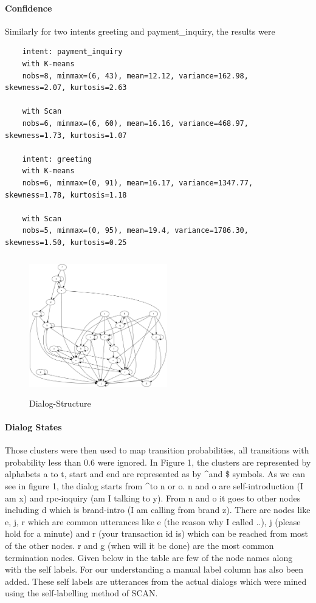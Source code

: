 \documentclass{article}
\begin{document}
\paragraph{Confidence}
Similarly for two intents greeting and payment\_inquiry, the results were

\begin{verbatim}
    intent: payment_inquiry
    with K-means
    nobs=8, minmax=(6, 43), mean=12.12, variance=162.98, skewness=2.07, kurtosis=2.63
    
    with Scan
    nobs=6, minmax=(6, 60), mean=16.16, variance=468.97, skewness=1.73, kurtosis=1.07
    
    intent: greeting 
    with K-means
    nobs=6, minmax=(0, 91), mean=16.17, variance=1347.77, skewness=1.78, kurtosis=1.18
    
    with Scan
    nobs=5, minmax=(0, 95), mean=19.4, variance=1786.30, skewness=1.50, kurtosis=0.25
\end{verbatim}

\begin{figure}[!htb]
\centering
\includegraphics[width=6cm, height=6cm]{dialog_structure.png}
\caption{Dialog-Structure}
\end{figure}

\paragraph{Dialog States}    
Those clusters were then used to map transition probabilities, all transitions with probability less than 0.6 were ignored. In Figure 1, the clusters are represented by alphabets a to t, start and end are represented as by \textasciicircum and \$ symbols. 
\newline
As we can see in figure 1, the dialog starts from \textasciicircum to n or o. n and o are self-introduction (I am x)  and rpc-inquiry (am I talking to y). From n and o it goes to other nodes including d which is brand-intro (I am calling from brand z). There are nodes like e, j, r which are common utterances like e (the reason why I called ..), j (please hold for a minute) and r (your transaction id is) which can be reached from most of the other nodes. r and g (when will it be done) are the most common termination nodes. Given below in the table are few of the node names along with the self labels. For our understanding a manual label column has also been added. These self labels are utterances from the actual dialogs which were mined using the self-labelling method of SCAN.
\end{document}
